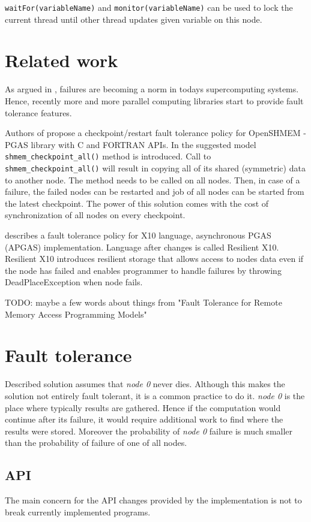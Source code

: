 \documentclass{llncs}
\newcommand{\inlinecode}{\texttt}
\begin{document}
\inlinecode{waitFor(variableName)} and \inlinecode{monitor(variableName)} can be used to lock the current thread until other thread updates given variable on this node.

\section{Related work}
As argued in \cite{shmem}, failures are becoming a norm in todays supercomputing systems.
Hence, recently more and more parallel computing libraries start to provide fault tolerance features.

Authors of \cite{shmem} propose a checkpoint/restart fault tolerance policy for OpenSHMEM - PGAS library with C and FORTRAN APIs.
In the suggested model \inlinecode{shmem\_checkpoint\_all()} method is introduced.
Call to \inlinecode{shmem\_checkpoint\_all()} will result in copying all of its shared (symmetric) data to another node.
The method needs to be called on all nodes.
Then, in case of a failure, the failed nodes can be restarted and job of all nodes can be started from the latest checkpoint.
The power of this solution comes with the cost of synchronization of all nodes on every checkpoint.

\cite{RX10} describes a fault tolerance policy for X10 language, asynchronous PGAS (APGAS) implementation.
Language after changes is called Resilient X10.
Resilient X10 introduces resilient storage that allows access to nodes data even if the node has failed
and enables programmer to handle failures by throwing DeadPlaceException when node fails.

TODO: maybe a few words about things from "Fault Tolerance for Remote Memory Access Programming Models"

\section{Fault tolerance}
Described solution assumes that \emph{node 0} never dies.
Although this makes the solution not entirely fault tolerant, it is a common practice to do it.
\emph{node 0} is the place where typically results are gathered.
Hence if the computation would continue after its failure, it would require additional work to find where the results were stored.
Moreover the probability of \emph{node 0} failure is much smaller than the probability of failure of one of all nodes.

\subsection{API}
The main concern for the API changes provided by the implementation is not to break currently implemented programs.
\end{document}
